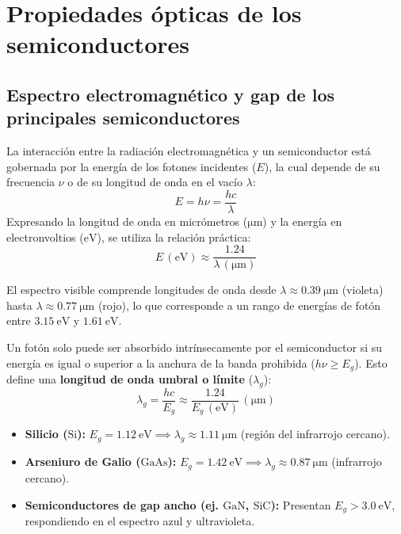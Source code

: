 \section{Propiedades ópticas de los semiconductores}

\subsection{Espectro electromagnético y gap de los principales semiconductores}

La interacción entre la radiación electromagnética y un semiconductor está gobernada por la energía de los fotones incidentes ($E$), la cual depende de su frecuencia $\nu$ o de su longitud de onda en el vacío $\lambda$:
\[
E = h\nu = \frac{hc}{\lambda}
\]
Expresando la longitud de onda en micrómetros ($\si{\micro\meter}$) y la energía en electronvoltios ($\si{\eV}$), se utiliza la relación práctica:
\[
E \, (\text{eV}) \approx \frac{1.24}{\lambda \, (\si{\micro\meter})}
\]

El espectro visible comprende longitudes de onda desde $\lambda \approx \SI{0.39}{\micro\meter}$ (violeta) hasta $\lambda \approx \SI{0.77}{\micro\meter}$ (rojo), lo que corresponde a un rango de energías de fotón entre $\SI{3.15}{\eV}$ y $\SI{1.61}{\eV}$.

\begin{concepto}
Un fotón solo puede ser absorbido intrínsecamente por el semiconductor si su energía es igual o superior a la anchura de la banda prohibida ($h\nu \ge E_g$). Esto define una \textbf{longitud de onda umbral o límite} ($\lambda_g$):
\[
\lambda_g = \frac{hc}{E_g} \approx \frac{1.24}{E_g \, (\text{eV})} \, (\si{\micro\meter})
\]
\begin{itemize}
    \item \textbf{Silicio ($\text{Si}$):} $E_g = \SI{1.12}{\eV} \implies \lambda_g \approx \SI{1.11}{\micro\meter}$ (región del infrarrojo cercano).
    \item \textbf{Arseniuro de Galio ($\text{GaAs}$):} $E_g = \SI{1.42}{\eV} \implies \lambda_g \approx \SI{0.87}{\micro\meter}$ (infrarrojo cercano).
    \item \textbf{Semiconductores de gap ancho (ej. $\text{GaN}$, $\text{SiC}$):} Presentan $E_g > \SI{3.0}{\eV}$, respondiendo en el espectro azul y ultravioleta.
\end{itemize}
\end{concepto}

